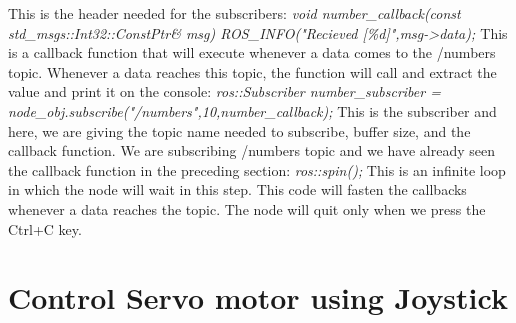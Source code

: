   This is the header needed for the subscribers: 
  \textit{void number\_callback(const std\_msgs::Int32::ConstPtr\& msg) { ROS\_INFO("Recieved [\%d]",msg->data); }} 
  This is a callback function that will execute whenever a data comes to the /numbers topic.
  Whenever a data reaches this topic, the function will call and extract the value and print it on the console: 
  \textit{ros::Subscriber number\_subscriber = node\_obj.subscribe("/numbers",10,number\_callback);} 
  This is the subscriber and here, we are giving the topic name needed to subscribe, buffer size, and the callback function. We are subscribing /numbers topic and we have already seen the callback function in the preceding section:\textit{ ros::spin();}
  This is an infinite loop in which the node will wait in this step. This code will fasten the callbacks whenever a data reaches the topic. The node will quit only when we press the Ctrl+C key.
  
 \section{Control Servo motor using Joystick}
 
